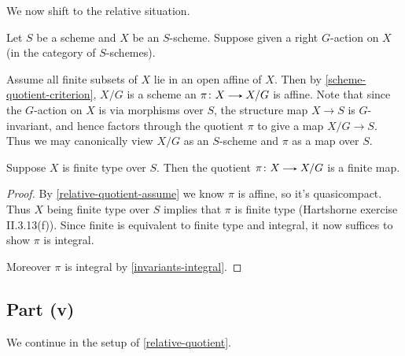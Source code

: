 We now shift to the relative situation.

\begin{nothing}
  \label{relative-quotient}
  Let $S$ be a scheme and $X$ be an $S$-scheme. Suppose given a right $G$-action on $X$ (in the category of $S$-schemes).

  \begin{subassumption}
    \label{relative-quotient-assume}
    Assume all finite subsets of $X$ lie in an open affine of $X$. Then by \cref{scheme-quotient-criterion}, $X/G$ is a scheme an $\pi \c X \to X/G$ is affine. Note that since the $G$-action on $X$ is via morphisms over $S$, the structure map $X \to S$ is $G$-invariant, and hence factors through the quotient $\pi$ to give a map $X/G \to S$. Thus we may canonically view $X/G$ as an $S$-scheme and $\pi$ as a map over $S$.
  \end{subassumption}

  \begin{sublemma}
    \label{relative-quotient-finite}
    Suppose $X$ is finite type over $S$. Then the quotient $\pi \c X \to X/G$ is a finite map.

    \begin{proof}
      By \cref{relative-quotient-assume} we know $\pi$ is affine, so it's quasicompact. Thus $X$ being finite type over $S$ implies that $\pi$ is finite type (Hartshorne exercise II.3.13(f)). Since finite is equivalent to finite type and integral, it now suffices to show $\pi$ is integral. 

      Moreover $\pi$ is integral by \cref{invariants-integral}.
    \end{proof}
  \end{sublemma}
\end{nothing}


\subsection*{Part (v)}

We continue in the setup of \cref{relative-quotient}.

